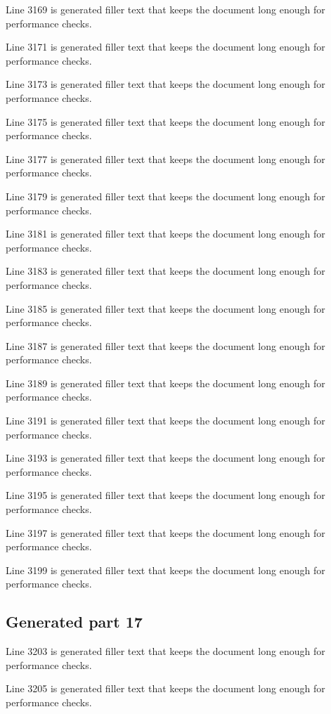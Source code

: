 Line 3169 is generated filler text that keeps the document long enough for performance checks.

Line 3171 is generated filler text that keeps the document long enough for performance checks.

Line 3173 is generated filler text that keeps the document long enough for performance checks.

Line 3175 is generated filler text that keeps the document long enough for performance checks.

Line 3177 is generated filler text that keeps the document long enough for performance checks.

Line 3179 is generated filler text that keeps the document long enough for performance checks.

Line 3181 is generated filler text that keeps the document long enough for performance checks.

Line 3183 is generated filler text that keeps the document long enough for performance checks.

Line 3185 is generated filler text that keeps the document long enough for performance checks.

Line 3187 is generated filler text that keeps the document long enough for performance checks.

Line 3189 is generated filler text that keeps the document long enough for performance checks.

Line 3191 is generated filler text that keeps the document long enough for performance checks.

Line 3193 is generated filler text that keeps the document long enough for performance checks.

Line 3195 is generated filler text that keeps the document long enough for performance checks.

Line 3197 is generated filler text that keeps the document long enough for performance checks.

Line 3199 is generated filler text that keeps the document long enough for performance checks.

\subsection{Generated part 17}

Line 3203 is generated filler text that keeps the document long enough for performance checks.

Line 3205 is generated filler text that keeps the document long enough for performance checks.

